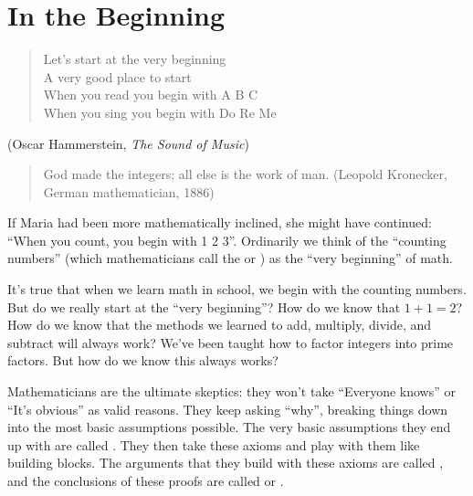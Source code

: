 
\section{In the Beginning\quad
{}}
\label{sec:InTheBeginning}

\begin{verse}
Let's start at the very beginning\\
A very good place to start\\
When you read you begin with A B C\\
When you sing you begin with Do Re Me
\end{verse}

(Oscar Hammerstein, \emph{The Sound of Music})

\begin{quote}
God made the integers; all else is the work of man.
 (Leopold Kronecker, German mathematician, 1886)
\end{quote}
\bigskip

If Maria had been more mathematically inclined, she might have continued:  ``When you count, you begin with 1 2 3''. Ordinarily we think of the ``counting numbers''  (which mathematicians call the  or ) as the ``very beginning'' of math. 

It's true that when we learn math in school, we begin with the counting numbers. But do we really start at the ``very beginning''?   How do we know that $1 + 1 = 2$? How do we know that the methods we learned to add,  multiply, divide, and subtract will always work? We've been taught how to factor integers into prime factors. But how do we know this always works?

 Mathematicians  are the ultimate skeptics: they won't take ``Everyone knows'' or ``It's obvious''  as valid reasons. They keep asking ``why'', breaking things down into the most basic assumptions possible. The very basic assumptions they end up with are called . They then take these axioms and play with them like building blocks. The arguments that they build with these axioms are called , and the conclusions of these proofs are called  or .  

